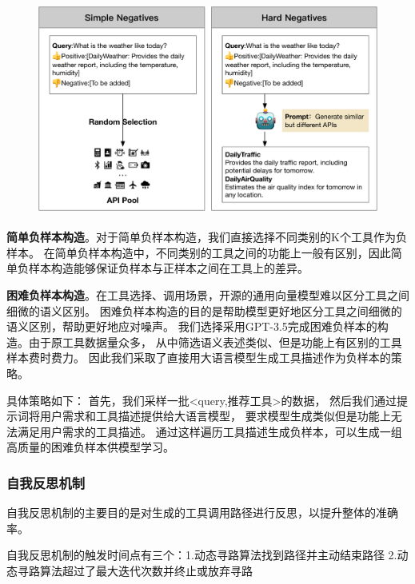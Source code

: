 \begin{figure}[!htp]
  \vspace{1em}
  \centering
  \setlength{\abovecaptionskip}{10pt} %
  \includegraphics[height=7cm]{../assets/ch3-负样本构造.pdf}
  \label{fig:negative-sample-generation}
\end{figure}

\indent \textbf{简单负样本构造}。对于简单负样本构造，我们直接选择不同类别的K个工具作为负样本。
在简单负样本构造中，不同类别的工具之间的功能上一般有区别，因此简单负样本构造能够保证负样本与正样本之间在工具上的差异。

\indent \textbf{困难负样本构造}。在工具选择、调用场景，开源的通用向量模型难以区分工具之间细微的语义区别。
困难负样本构造的目的是帮助模型更好地区分工具之间细微的语义区别，帮助更好地应对噪声。
我们选择采用GPT-3.5完成困难负样本的构造。由于原工具数据量众多，
从中筛选语义表述类似、但是功能上有区别的工具样本费时费力。
因此我们采取了直接用大语言模型生成工具描述作为负样本的策略。

具体策略如下：
首先，我们采样一批<query,推荐工具>的数据，
然后我们通过提示词将用户需求和工具描述提供给大语言模型，
要求模型生成类似但是功能上无法满足用户需求的工具描述。
通过这样遍历工具描述生成负样本，可以生成一组高质量的困难负样本供模型学习。

\subsubsection{自我反思机制}

自我反思机制的主要目的是对生成的工具调用路径进行反思，以提升整体的准确率。

自我反思机制的触发时间点有三个：1.动态寻路算法找到路径并主动结束路径
2.动态寻路算法超过了最大迭代次数并终止或放弃寻路

